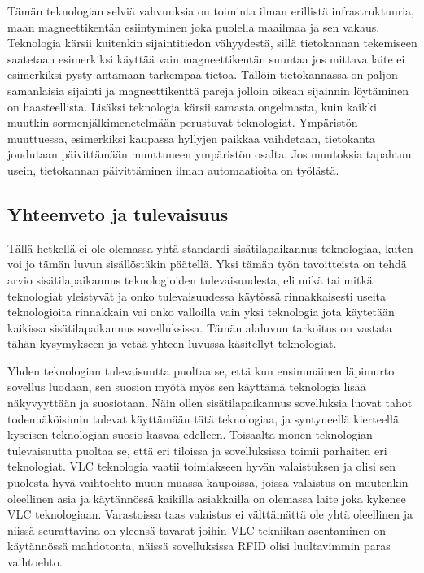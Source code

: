 Tämän teknologian selviä vahvuuksia on toiminta ilman erillistä infrastruktuuria, maan magneettikentän esiintyminen joka puolella maailmaa ja sen vakaus\cite{magneetti}. Teknologia kärsii kuitenkin sijaintitiedon vähyydestä, sillä tietokannan tekemiseen saatetaan esimerkiksi käyttää vain magneettikentän suuntaa jos mittava laite ei esimerkiksi pysty antamaan tarkempaa tietoa\cite{magneetti}. Tällöin tietokannassa on paljon samanlaisia sijainti ja magneettikenttä pareja jolloin oikean sijainnin löytäminen on haasteellista. Lisäksi teknologia kärsii samasta ongelmasta, kuin kaikki muutkin sormenjälkimenetelmään perustuvat teknologiat. Ympäristön muuttuessa, esimerkiksi kaupassa hyllyjen paikkaa vaihdetaan, tietokanta joudutaan päivittämään muuttuneen ympäristön osalta. Jos muutoksia tapahtuu usein, tietokannan päivittäminen ilman automaatioita on työlästä.

\subsection{Yhteenveto ja tulevaisuus}
Tällä hetkellä ei ole olemassa yhtä standardi sisätilapaikannus teknologiaa, kuten voi jo tämän luvun sisällöstäkin päätellä. Yksi tämän työn tavoitteista on tehdä arvio sisätilapaikannus teknologioiden tulevaisuudesta, eli mikä tai mitkä teknologiat yleistyvät ja onko tulevaisuudessa käytössä rinnakkaisesti useita teknologioita rinnakkain vai onko valloilla vain yksi teknologia jota käytetään kaikissa sisätilapaikannus sovelluksissa. Tämän alaluvun tarkoitus on vastata tähän kysymykseen ja vetää yhteen luvussa käsitellyt teknologiat.

Yhden teknologian tulevaisuutta puoltaa se, että kun ensimmäinen läpimurto sovellus luodaan, sen suosion myötä myös sen käyttämä teknologia lisää näkyvyyttään ja suosiotaan. Näin ollen sisätilapaikannus sovelluksia luovat tahot todennäköisimin tulevat käyttämään tätä teknologiaa, ja syntyneellä kierteellä kyseisen teknologian suosio kasvaa edelleen. Toisaalta monen teknologian tulevaisuutta puoltaa se, että eri tiloissa ja sovelluksissa toimii parhaiten eri teknologiat. VLC teknologia vaatii toimiakseen hyvän valaistuksen ja olisi sen puolesta hyvä vaihtoehto muun muassa kaupoissa, joissa valaistus on muutenkin oleellinen asia ja käytännössä kaikilla asiakkailla on olemassa laite joka kykenee VLC teknologiaan. Varastoissa taas valaistus ei välttämättä ole yhtä oleellinen ja niissä seurattavina on yleensä tavarat joihin VLC tekniikan asentaminen on käytännössä mahdotonta, näissä sovelluksissa RFID olisi luultavimmin paras vaihtoehto.

